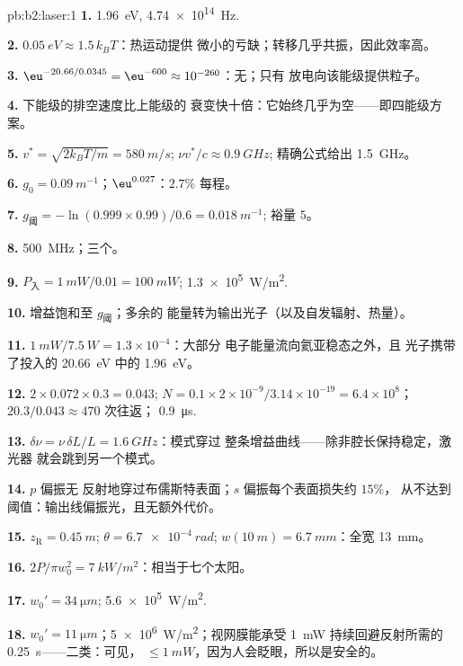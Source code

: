 \begin{solution}{pb:b2:laser:1}
\textbf{1.} \qty{1.96}{eV}, \qty{4.74e14}{Hz}.

\textbf{2.} $\qty{0.05}{eV} \approx 1.5\,k_BT$：热运动提供
微小的亏缺；转移几乎共振，因此效率高。

\textbf{3.} $\eu^{-20.66/0.0345} = \eu^{-600} \approx 10^{-260}$：无；只有
放电向该能级提供粒子。

\textbf{4.} 下能级的排空速度比上能级的
衰变快十倍：它始终几乎为空——即四能级方案。

\textbf{5.} $v^* = \sqrt{2k_BT/m} = \qty{580}{m/s}$; $\nu v^*/c \approx \qty{0.9}{GHz}$;
精确公式给出 \qty{1.5}{GHz}。

\textbf{6.} $g_0 = \qty{0.09}{m^{-1}}$；$\eu^{0.027}$：$2.7\%$ 每程。

\textbf{7.} $g_{\text{阈}} = -\ln(0.999 \times 0.99)/0.6 = \qty{0.018}{m^{-1}}$;
裕量 $5$。

\textbf{8.} \qty{500}{MHz}；三个。

\textbf{9.} $P_{\text{入}} = \qty{1}{mW}/0.01 = \qty{100}{mW}$; \qty{1.3e5}{W/m^2}.

\textbf{10.} 增益饱和至 $g_{\text{阈}}$；多余的
能量转为输出光子（以及自发辐射、热量）。

\textbf{11.} $\qty{1}{mW}/\qty{7.5}{W} = 1.3 \times 10^{-4}$：大部分
电子能量流向氦亚稳态之外，且
光子携带了投入的 \qty{20.66}{eV} 中的 \qty{1.96}{eV}。

\textbf{12.} $2 \times 0.072 \times 0.3 = 0.043$; $N = 0.1 \times 2 \times 10^{-9}/3.14
\times 10^{-19} = 6.4 \times 10^8$；$20.3/0.043 \approx 470$ 次往返；
\qty{0.9}{\micro s}.

\textbf{13.} $\delta\nu = \nu\,\delta L/L = \qty{1.6}{GHz}$：模式穿过
整条增益曲线——除非腔长保持稳定，激光器
就会跳到另一个模式。

\textbf{14.} $p$ 偏振无
反射地穿过布儒斯特表面；$s$ 偏振每个表面损失约 $15\%$，
从不达到阈值：输出线偏振光，且无额外代价。

\textbf{15.} $z_{\text{R}} = \qty{0.45}{m}$; $\theta = \qty{6.7e-4}{rad}$; $w(\qty{10}{m})
= \qty{6.7}{mm}$：全宽 \qty{13}{mm}。

\textbf{16.} $2P/\pi w_0^2 = \qty{7}{kW/m^2}$：相当于七个太阳。

\textbf{17.} $w_0' = \qty{34}{\micro m}$; \qty{5.6e5}{W/m^2}.

\textbf{18.} $w_0' = \qty{11}{\micro m}$；\qty{5e6}{W/m^2}；视网膜能承受
\qty{1}{mW} 持续回避反射所需的 \qty{0.25}{s}——二类：可见，
$\le \qty{1}{mW}$，因为人会眨眼，所以是安全的。


\end{solution}

